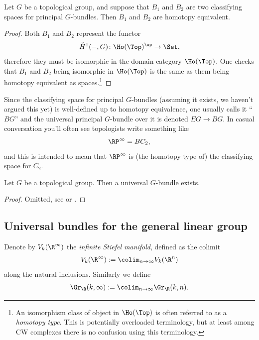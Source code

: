 \documentclass[11pt]{book}
\begin{document}
\begin{proposition}
Let $G$ be a topological group, and suppose that $B_1$ and $B_2$ are two classifying spaces for principal $G$-bundles. Then $B_1$ and $B_2$ are homotopy equivalent.
\end{proposition}
\begin{proof}
Both $B_1$ and $B_2$ represent the functor
\[
    \check{H}^1(-,G) \colon \Ho(\Top)^\op \to \Set,
\]
therefore they must be isomorphic in the domain category $\Ho(\Top)$. One checks that $B_1$ and $B_2$ being isomorphic in $\Ho(\Top)$ is the same as them being homotopy equivalent as spaces.\footnote{An isomorphism class of object in $\Ho(\Top)$ is often referred to as a \emph{homotopy type}. This is potentially overloaded terminology, but at least among CW complexes there is no confusion using this terminology.}
\end{proof}

\begin{notation}
Since the classifying space for principal $G$-bundles (assuming it exists, we haven't argued this yet) is well-defined up to homotopy equivalence, one usually calls it ``$BG$'' and the universal principal $G$-bundle over it is denoted $EG \to BG$. In casual conversation you'll often see topologists write something like
\[
\RP^\infty = BC_2,
\]
and this is intended to mean that $\RP^\infty$ is (the homotopy type of) the classifying space for $C_2$.
\end{notation}



\begin{theorem}
\label{thm:existence-universal-G-bundles}
Let $G$ be a topological group. Then a universal $G$-bundle exists.
\end{theorem}
\begin{proof} Omitted, see \cite[\S12.2]{AGP} or \cite[\S16.5]{maybook}.
\end{proof}

\subsection{Universal bundles for the general linear group}

\begin{notation} Denote by $V_k(\R^\infty)$ the \emph{infinite Stiefel manifold}, defined as the colimit
\begin{align*}
    V_k(\R^\infty) := \colim_{n\to\infty} V_k(\R^n)
\end{align*}
along the natural inclusions. Similarly we define
\begin{align*}
    \Gr_\R(k,\infty) := \colim_{n\to\infty} \Gr_\R(k,n).
\end{align*}
\end{notation}
\end{document}
